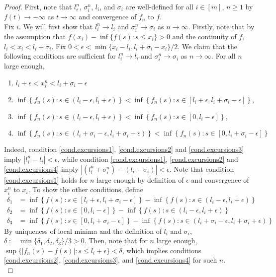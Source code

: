 \begin{proof}
First, note that $l_i^n$, $\sigma_i^n$, $l_i$, and $\sigma_i$ are well-defined for all $i\in [m]$, $n\geq 1$ by $f(t)\to -\infty$ as $t\to \infty$ and convergence of $f_n$ to $f$. \\
Fix $i$. We will first show that $l^n_i\to l_i$ and $\sigma_i^n\to \sigma_i$ as $n\to \infty$. Firstly, note that by the assumption that $f(x_i)-\inf\{f(s):s\leq x_i\}>0$ and the continuity of $f$, $l_i<x_i<l_i+\sigma_i$. Fix $0<\epsilon<\min\{x_i-l_i,l_i+\sigma_i-x_i\}/2$. We claim that the following conditions are sufficient for $l^n_i\to l_i$ and $\sigma_i^n\to \sigma_i$ as $n\to \infty$. For all $n$ large enough,
\begin{enumerate}
    \item \label{cond.excursions1} $l_i+\epsilon<x^n_i<l_i+\sigma_i-\epsilon$
    \item \label{cond.excursions2}$\inf\left\{f_n(s):s\in (l_i-\epsilon, l_i+\epsilon)\right\}<\inf\left\{f_n(s):s\in [l_i+\epsilon,l_i+\sigma_i-\epsilon] \right\}$, 
    \item \label{cond.excursions3}$\inf\left\{f_n(s):s\in (l_i-\epsilon, l_i+\epsilon)\right\}<\inf\left\{f_n(s):s\in [0,l_i-\epsilon]\right\}$,
    \item \label{cond.excursions4} $\inf\left\{ f_n(s):s\in (l_i+\sigma_i-\epsilon,l_i+\sigma_i+\epsilon)\right\}<\inf\left\{f_n(s):s\in [0,l_i+\sigma_i-\epsilon]\right\}$
\end{enumerate}
Indeed, condition \ref{cond.excursions1}, \ref{cond.excursions2} and \ref{cond.excursions3} imply $|l^n_i-l_i|<\epsilon$, while condition \ref{cond.excursions1}, \ref{cond.excursions2} and \ref{cond.excursions4} imply $|(l^n_i+\sigma^n_i)-(l_i+\sigma_i)|<\epsilon$. Note that condition \ref{cond.excursions1} holds for $n$ large enough by definition of $\epsilon$ and convergence of $x_i^n$ to $x_i$. To show the other conditions, define
\begin{align*}\delta_1&=\inf\left\{f(s):s\in [l_i+\epsilon,l_i+\sigma_i-\epsilon]\right\}-\inf\left\{f(s):s\in (l_i-\epsilon,l_i+\epsilon)\right\}\\
\delta_2&=\inf\left\{f(s):s\in [0,l_i-\epsilon]\right\}-\inf\left\{f(s):s\in (l_i-\epsilon,l_i+\epsilon)\right\}\\
\delta_3&=\inf\left\{f(s):s\in [0,l_i+\sigma_i-\epsilon]\right\}-\inf\left\{f(s):s\in (l_i+\sigma_i-\epsilon,l_i+\sigma_i+\epsilon)\right\}
\end{align*}
By uniqueness of local minima and the definition of $l_i$ and $\sigma_i$,  $\delta:=\min\{\delta_1,\delta_2,\delta_3\}/3>0$. Then, note that for $n$ large enough, $\sup\{|f_n(s)-f(s)|:s\leq l_i+\epsilon\}<\delta$, which implies conditions \ref{cond.excursions2}, \ref{cond.excursions3}, and \ref{cond.excursions4} for such $n$. \\

\end{proof}
